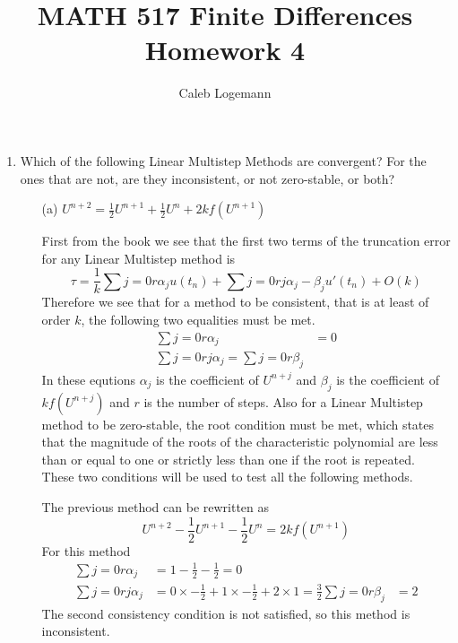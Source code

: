 \documentclass[11pt, oneside, titlepage]{article}
\title{MATH 517 Finite Differences Homework 4}
\author{Caleb Logemann}
\begin{document}
\maketitle

%
\begin{enumerate}
    \item %
        Which of the following Linear Multistep Methods are convergent?
        For the ones that are not, are they inconsistent, or not zero-stable,
        or both?
        \begin{enumerate}
            \item[(a)] %
                $U^{n+2} = \frac{1}{2} U^{n+1} + \frac{1}{2}U^n + 2k f(U^{n+1})$

                First from the book we see that the first two terms of the
                truncation error for any Linear Multistep method is
                \[
                    \tau = \frac{1}{k}\sum{j=0}{r}{\alpha_j} u(t_n) +
                    \sum{j=0}{r}{j\alpha_j - \beta_j} u'(t_n) + O(k)
                \]
                Therefore we see that for a method to be consistent, that is
                at least of order $k$, the following two equalities must be met.
                \begin{align*}
                    \sum{j=0}{r}{\alpha_j} &= 0 \\
                    \sum{j=0}{r}{j \alpha_j} = \sum{j=0}{r}{\beta_j}
                \end{align*}
                In these equtions $\alpha_j$ is the coefficient of $U^{n+j}$ and
                $\beta_j$ is the coefficient of $k f(U^{n+j})$ and $r$ is the
                number of steps.
                Also for a Linear Multistep method to be zero-stable, the root
                condition must be met, which states that the magnitude of the
                roots of the characteristic polynomial are less than or equal to
                one or strictly less than one if the root is repeated.
                These two conditions will be used to test all the following
                methods.

                The previous method can be rewritten as
                \[
                    U^{n+2} - \frac{1}{2}U^{n+1} - \frac{1}{2}U^n = 2k f(U^{n+1})
                \]
                For this method
                \begin{align*}
                    \sum{j=0}{r}{\alpha_j} &= 1 - \frac{1}{2} - \frac{1}{2} = 0 \\
                    \sum{j=0}{r}{j \alpha_j} &= 0 \times -\frac{1}{2} + 1 \times -\frac{1}{2} + 2 \times 1 = \frac{3}{2}
                    \sum{j=0}{r}{\beta_j} &= 2
                \end{align*}
                The second consistency condition is not satisfied, so this
                method is inconsistent.


\end{enumerate}
\end{enumerate}
\end{document}
